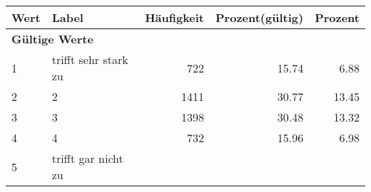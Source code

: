      \begin{longtable}{lXrrr}
     \toprule
     \textbf{Wert} & \textbf{Label} & \textbf{Häufigkeit} & \textbf{Prozent(gültig)} & \textbf{Prozent} \\
     \endhead
     \midrule
     \multicolumn{5}{l}{\textbf{Gültige Werte}}\\

     1 &
     \multicolumn{1}{X}{ trifft sehr stark zu   } &


       \num{722} &
       \num[round-mode=places,round-precision=2]{15,74} &
         \num[round-mode=places,round-precision=2]{6,88} \\

     2 &
     \multicolumn{1}{X}{ 2   } &


       \num{1411} &
       \num[round-mode=places,round-precision=2]{30,77} &
         \num[round-mode=places,round-precision=2]{13,45} \\

     3 &
     \multicolumn{1}{X}{ 3   } &


       \num{1398} &
       \num[round-mode=places,round-precision=2]{30,48} &
         \num[round-mode=places,round-precision=2]{13,32} \\

     4 &
     \multicolumn{1}{X}{ 4   } &


       \num{732} &
       \num[round-mode=places,round-precision=2]{15,96} &
         \num[round-mode=places,round-precision=2]{6,98} \\

     5 &
     \multicolumn{1}{X}{ trifft gar nicht zu   } &



\end{longtable}
